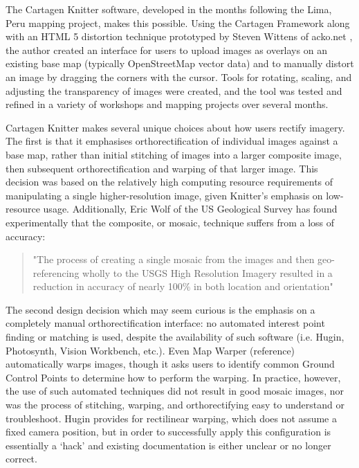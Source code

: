 \documentclass[11pt]{report}
\begin{document}
The Cartagen Knitter software, developed in the months following the Lima, Peru mapping project, makes this possible. Using the Cartagen Framework along with an HTML 5 distortion technique prototyped by Steven Wittens of acko.net \cite{wittens2008projective}, the author created an interface for users to upload images as overlays on an existing base map (typically OpenStreetMap vector data) and to manually distort an image by dragging the corners with the cursor. Tools for rotating, scaling, and adjusting the transparency of images were created, and the tool was tested and refined in a variety of workshops and mapping projects over several months. 

Cartagen Knitter makes several unique choices about how users rectify imagery. The first is that it emphasises orthorectification of individual images against a base map, rather than initial stitching of images into a larger composite image, then subsequent orthorectification and warping of that larger image. This decision was based on the relatively high computing resource requirements of manipulating a single higher-resolution image, given Knitter's emphasis on low-resource usage. Additionally, Eric Wolf of the US Geological Survey has found experimentally that the composite, or mosaic, technique suffers from a loss of accuracy: 

\begin{quote}
"The process of creating a single mosaic from the images and then geo-referencing wholly to the USGS High Resolution Imagery resulted in a reduction in accuracy of nearly 100\% in both location and orientation"
\cite{wolf2006lowcost}
\end{quote}

The second design decision which may seem curious is the emphasis on a completely manual orthorectification interface: no automated interest point finding or matching is used, despite the availability of such software (i.e. Hugin, Photosynth, Vision Workbench, etc.). Even Map Warper (reference) automatically warps images, though it asks users to identify common Ground Control Points to determine how to perform the warping. In practice, however, the use of such automated techniques did not result in good mosaic images, nor was the process of stitching, warping, and orthorectifying easy to understand or troubleshoot. Hugin provides for rectilinear warping, which does not assume a fixed camera position, but in order to successfully apply this configuration is essentially a `hack' and existing documentation is either unclear or no longer correct.
\end{document}
